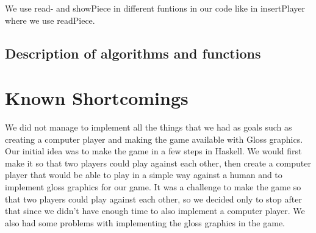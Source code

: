 \documentclass[12pt,a4paper]{article}
\begin{document}
We use read- and showPiece in different funtions in our code like in insertPlayer where we use readPiece.

\subsection{Description of algorithms and functions}

\section{Known Shortcomings}
We did not manage to implement all the things that we had as goals such as creating a computer player and making the game available with Gloss graphics.
Our initial idea was to make the game in a few steps in Haskell. We would first make it so that two players could play against each other, then create a computer player that would be able to play in a simple way against a human and to implement gloss graphics for our game. It was a challenge to make the game so that two players could play against each other, so we decided only to stop after that since we didn’t have enough time to also implement a computer player. We also had some problems with implementing the gloss graphics in the game.
\end{document}
